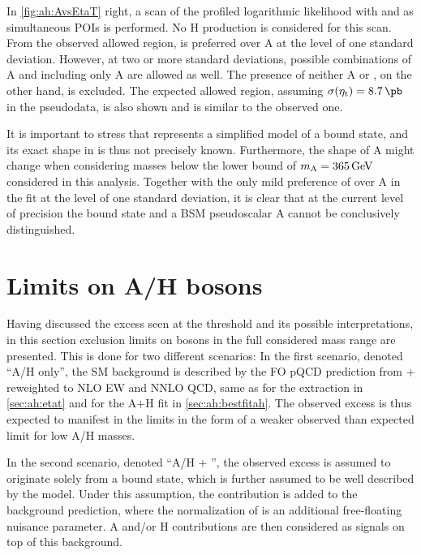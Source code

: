 In \cref{fig:ah:AvsEtaT} right, a scan of the profiled logarithmic likelihood with \gAtt and \sigetat as simultaneous POIs is performed. No H production is considered for this scan. From the observed allowed region, \etat is preferred over A at the level of one standard deviation. However, at two or more standard deviations, possible combinations of A and \etat including only A are allowed as well. The presence of neither A or \etat, on the other hand, is excluded. The expected allowed region, assuming $\sigetat = \SI{8.7}{\pb}$ in the pseudodata, is also shown and is similar to the observed one.

It is important to stress that \etat represents a simplified model of a \ttbar bound state, and its exact shape in \mtt is thus not precisely known. Furthermore, the \mtt shape of A might change when considering masses below the lower bound of $\mA = \SI{365}{\GeV}$ considered in this analysis. Together with the only mild preference of \etat over A in the fit at the level of one standard deviation, it is clear that at the current level of precision the \ttbar bound state \etat and a BSM pseudoscalar A cannot be conclusively distinguished. 

\section{Limits on A/H bosons}
\label{sec:ah:limits}

Having discussed the excess seen at the \ttbar threshold and its possible interpretations, in this section exclusion limits on \AH bosons in the full considered mass range are presented. This is done for two different scenarios: In the first scenario, denoted ``A/H only'', the SM \ttbar background is described by the FO pQCD prediction from \powheg + \pythia reweighted to NLO EW and NNLO QCD, same as for the \etat extraction in \cref{sec:ah:etat} and for the A+H fit in \cref{sec:ah:bestfitah}. The observed excess is thus expected to manifest in the limits in the form of a weaker observed than expected limit for low A/H masses.

In the second scenario, denoted ``A/H + \etat'', the observed excess is assumed to originate solely from a \ttbar bound state, which is further assumed to be well described by the \etat model. Under this assumption, the \etat contribution is added to the \ttbar background prediction, where the normalization of \etat is an additional free-floating nuisance parameter. A and/or H contributions are then considered as signals on top of this background. %


